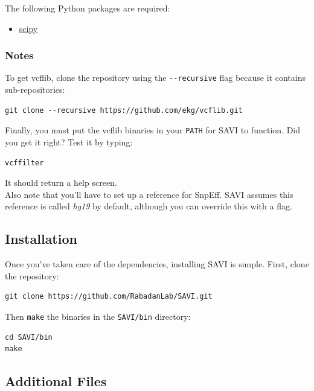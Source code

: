 \documentclass[letterpaper,14pt]{memoir}
\begin{document}
\noindent The following Python packages are required:

\begin{itemize}
\tightlist
\item
  \href{http://www.scipy.org}{scipy}
\end{itemize}

\subsubsection{Notes}

\noindent To get vcflib, clone the repository using the \texttt{-{}-recursive} flag because it contains sub-repositories:

\begin{Verbatim}
git clone --recursive https://github.com/ekg/vcflib.git
\end{Verbatim}

\noindent Finally, you must put the vcflib binaries in your \texttt{PATH} for SAVI to function. Did you get it right? Test it by typing:

\begin{Verbatim}
vcffilter
\end{Verbatim}

\noindent It should return a help screen.\\ 

\noindent Also note that you'll have to set up a reference for SnpEff. SAVI assumes this reference is called \textit{hg19} by default, although you can override this with a flag.

\subsection{Installation}\label{Installation}

\noindent Once you've taken care of the dependencies, installing SAVI is simple. First, clone the repository:

\begin{Verbatim}
git clone https://github.com/RabadanLab/SAVI.git
\end{Verbatim}

\noindent Then \texttt{make}
the binaries in the \texttt{SAVI/bin} directory:

\begin{Verbatim}
cd SAVI/bin
make
\end{Verbatim}

\subsection{Additional Files}\label{Additional Files}
\end{document}
